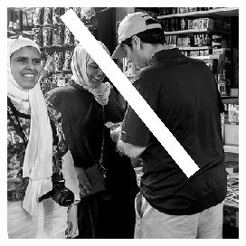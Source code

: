 \documentclass{beamer}
\begin{document}
\begin{frame}[fragile]
\begin{columns}
\begin{column}{.32\textwidth}
\begin{figure}
	\end{figure}
	\end{column}
	\begin{column}{.32\textwidth}
	\begin{figure}
	  \includegraphics[width=\textwidth,height=0.45\textheight]{20441017631}
	\end{figure}
	\end{column}
	\end{columns}

\end{frame}
\end{document}
